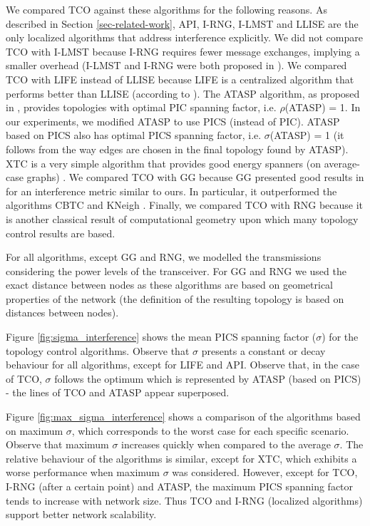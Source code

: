 \documentclass{llncs}
\begin{document}
We compared TCO against these algorithms for the following reasons. As described in Section \ref{sec-related-work}, API, \mbox{I-RNG}, \mbox{I-LMST} and LLISE are the only
localized algorithms that address interference explicitly. We did not compare TCO with I-LMST because I-RNG requires fewer message exchanges, implying a smaller overhead
(I-LMST and I-RNG were both proposed in  \cite{Li05}). 
We compared TCO with LIFE instead of LLISE because LIFE is a centralized algorithm that performs
better than LLISE (according to \cite{burkhart2004}).  
The ATASP algorithm, as proposed in \cite{blough2005}, provides topologies with optimal PIC spanning factor, i.e. $\rho$(ATASP) = 1.
In our experiments, we modified ATASP to use PICS (instead of PIC). ATASP based on PICS also has optimal PICS spanning factor, i.e. 
$\sigma$(ATASP) = 1 (it follows from the way edges are chosen in the final topology found by ATASP). 
XTC is a very simple algorithm that provides good energy spanners (on average-case graphs) \cite{Wattenhofer2004}.
We compared TCO with GG because GG presented good results in \cite{blough2005} for an interference metric similar to ours. In particular, it outperformed the algorithms CBTC \cite{Li2005} and KNeigh \cite{Santi2003}. Finally, we compared TCO with RNG because it is another classical result of computational geometry upon
which many topology control results are based.

For all algorithms, except GG and RNG, we modelled the transmissions considering the power levels of the transceiver. 
For GG and RNG we used the exact distance between nodes as these algorithms are based on geometrical properties of the network
(the definition of the resulting topology is based on distances between nodes).

Figure \ref{fig:sigma_interference} shows the mean PICS spanning factor ($\sigma$) for the topology control algorithms. 
Observe that $\sigma$ presents a constant or decay behaviour for all algorithms, except for LIFE and API. 
Observe that, in the case of TCO, $\sigma$ follows the optimum which is represented by ATASP (based on PICS) - the lines of
TCO and ATASP appear superposed.

Figure \ref{fig:max_sigma_interference} shows a comparison of the algorithms based on maximum $\sigma$, which corresponds to the worst case for each specific scenario.
Observe that maximum $\sigma$ increases quickly when compared to the average $\sigma$. 
The relative behaviour of the algorithms is similar, except for XTC, which exhibits a worse performance when maximum $\sigma$ was considered.
However, except for TCO, I-RNG (after a certain point) and ATASP, the maximum PICS spanning factor tends to increase with network size. Thus TCO and I-RNG (localized algorithms)
support better network scalability.
\end{document}
